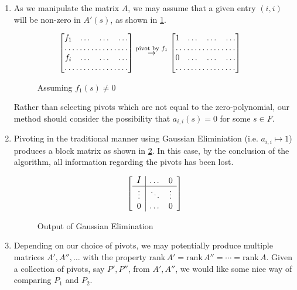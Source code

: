\documentclass{amsart}
\theoremstyle{definition}
\theoremstyle{remark}
\numberwithin{equation}{section}
\begin{document}
\begin{enumerate}
\item As we manipulate the matrix $A$, we may assume that a given entry $(i,i)$ will be non-zero in $A'(s)$, as shown in \cref{fig:pivot-example}.
\begin{figure}[h]
  \centering
  \begin{align*}
    \begin{bmatrix}
      f_1 & \dots & \dots & \dots \\
      \hdotsfor{4} \\
      f_i & \dots & \dots & \dots \\
      \hdotsfor{4}
    \end{bmatrix} & \overset{\text{pivot by } f_1}{\to} \begin{bmatrix}
      1 & \dots & \dots & \dots \\
      \hdotsfor{4} \\
      0 & \dots & \dots & \dots \\
      \hdotsfor{4}
    \end{bmatrix}
  \end{align*}
  \caption{Assuming $f_1(s) \not= 0$}
  \label{fig:pivot-example}
\end{figure}

Rather than selecting pivots which are not equal to the zero-polynomial, our method should consider the possibility that $a_{i,i}(s) = 0$ for some $s \in F$.

\item Pivoting in the traditional manner using Gaussian Eliminiation (i.e. $a_{i,i} \mapsto 1$) produces a block matrix as shown in \cref{fig:gaussian-eliminiation-example}. In this case, by the conclusion of the algorithm, all information regarding the pivots has been lost.
\begin{figure}[h]
  \centering
  \begin{equation*}
    \left[
    \begin{array}{c | c c }
      \raisebox{0pt}{{\large\mbox{{$I$}}}} & \dots & 0 \\ \hline
      \vdots & \ddots & \vdots \\
      0 & \dots & 0
    \end{array}
    \right]
  \end{equation*}
  \caption{Output of Gaussian Elimination}
  \label{fig:gaussian-eliminiation-example}
\end{figure}

\item Depending on our choice of pivots, we may potentially produce multiple matrices $A', A'', \ldots$ with the property $\mathrm{rank} \, A' = \mathrm{rank} \, A'' = \cdots = \mathrm{rank} \, A$. Given a collection of pivots, say $P', P''$, from $A', A''$, we would like some nice way of comparing $P_1$ and $P_2$.

\end{enumerate}
\end{document}
